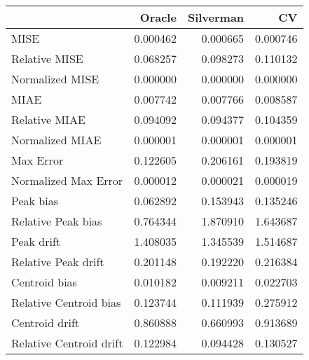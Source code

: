 \begin{tabular}{lrrr}
  \hline
 & Oracle & Silverman & CV \\ 
  \hline
MISE & 0.000462 & 0.000665 & 0.000746 \\ 
  Relative MISE & 0.068257 & 0.098273 & 0.110132 \\ 
  Normalized MISE & 0.000000 & 0.000000 & 0.000000 \\ 
  MIAE & 0.007742 & 0.007766 & 0.008587 \\ 
  Relative MIAE & 0.094092 & 0.094377 & 0.104359 \\ 
  Normalized MIAE & 0.000001 & 0.000001 & 0.000001 \\ 
  Max Error & 0.122605 & 0.206161 & 0.193819 \\ 
  Normalized Max Error & 0.000012 & 0.000021 & 0.000019 \\ 
  Peak bias & 0.062892 & 0.153943 & 0.135246 \\ 
  Relative Peak bias & 0.764344 & 1.870910 & 1.643687 \\ 
  Peak drift & 1.408035 & 1.345539 & 1.514687 \\ 
  Relative Peak drift & 0.201148 & 0.192220 & 0.216384 \\ 
  Centroid bias & 0.010182 & 0.009211 & 0.022703 \\ 
  Relative Centroid bias & 0.123744 & 0.111939 & 0.275912 \\ 
  Centroid drift & 0.860888 & 0.660993 & 0.913689 \\ 
  Relative Centroid drift & 0.122984 & 0.094428 & 0.130527 \\ 
   \hline
\end{tabular}
